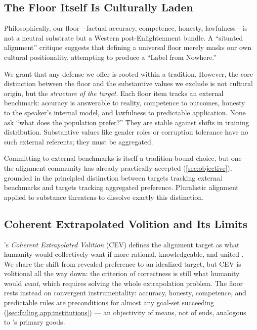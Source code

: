 \documentclass{article}
\theoremstyle{plain}
\theoremstyle{definition}
\theoremstyle{remark}
\begin{document}
\subsection{The Floor Itself Is Culturally Laden}
\label{sec:alt-cultural}
Philosophically, our floor---factual accuracy, competence, honesty, lawfulness---is not a neutral substrate but a Western post-Enlightenment bundle. A ``situated alignment'' critique \citep{arzberger2026label, wan2025noise} suggests that defining a universal floor merely masks our own cultural positionality, attempting to produce a ``Label from Nowhere.''

We grant that any defense we offer is rooted within a tradition. However, the core distinction between the floor and the substantive values we exclude is not cultural origin, but the \emph{structure of the target}. Each floor item tracks an external benchmark: accuracy is answerable to reality, competence to outcomes, honesty to the speaker's internal model, and lawfulness to predictable application. None ask ``what does the population prefer?'' They are stable against shifts in training distribution. Substantive values like gender roles or corruption tolerance have no such external referents; they must be aggregated.

Committing to external benchmarks is itself a tradition-bound choice, but one the alignment community has already practically accepted (\cref{sec:objective}), grounded in the principled distinction between targets tracking external benchmarks and targets tracking aggregated preference. Pluralistic alignment applied to substance threatens to dissolve exactly this distinction.

\subsection{Coherent Extrapolated Volition and Its Limits}
\label{sec:alt-cev}
\citet{yudkowsky2004cev}'s \emph{Coherent Extrapolated Volition} (CEV) defines the alignment target as what humanity would collectively want if more rational, knowledgeable, and united \citep{bostrom2014superintelligence}. We share the shift from revealed preference to an idealized target, but CEV is volitional all the way down: the criterion of correctness is still what humanity would \emph{want}, which requires solving the whole extrapolation problem. The floor rests instead on convergent instrumentality: accuracy, honesty, competence, and predictable rules are preconditions for almost any goal-set succeeding (\cref{sec:failing,app:institutions}) --- an objectivity of means, not of ends, analogous to \citet{rawls1971theory}'s primary goods.
\end{document}
